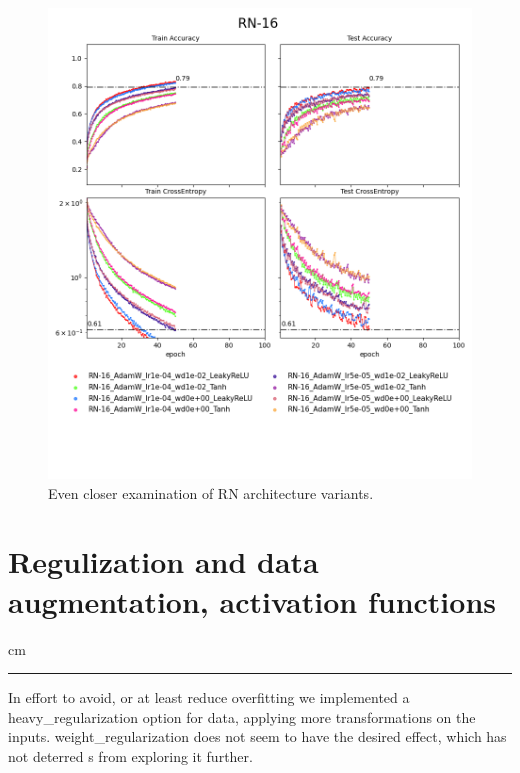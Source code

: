 \documentclass[12pt,a4paper]{article}
\newcommand {\sectionrule}{\vskip -0.9 cm
\color {mygray} \rule [0 cm] {17 cm}{0.1 mm} \color {black}}
\begin{document}
\begin{figure}[H]
  \includegraphics[width=\textwidth, trim={0, 3.5cm, 0, 0}, clip]{../logsRN16_0.png}
  \caption{Even closer examination of RN architecture variants.}
\end{figure}

\newpage

\section{Regulization and data augmentation, activation functions}
\sectionrule

In effort to avoid, or at least reduce overfitting
we implemented a heavy\_regularization option
for data, applying more transformations on the inputs. weight\_regularization
does not seem to have the desired effect, which has not deterred s from exploring it further.
\end{document}
